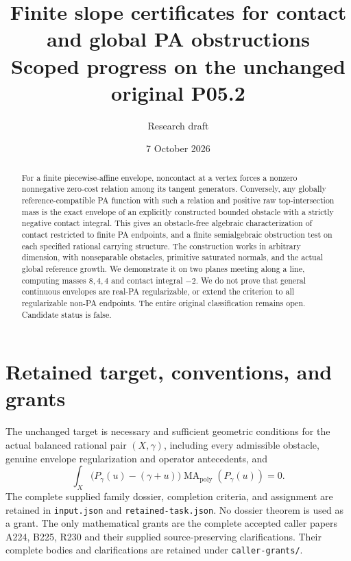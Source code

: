\documentclass[11pt]{article}
\title{Finite slope certificates for contact and global PA obstructions\\
\large Scoped progress on the unchanged original P05.2}
\author{Research draft}
\date{7 October 2026}
\newcommand{\MA}{\operatorname{MA}_{\mathrm{poly}}}
\begin{document}
\maketitle
\begin{abstract}
For a finite piecewise-affine envelope, noncontact at a vertex forces a nonzero
nonnegative zero-cost relation among its tangent generators. Conversely, any
globally reference-compatible PA function with such a relation and positive
raw top-intersection mass is the exact envelope of an explicitly constructed
bounded obstacle with a strictly negative contact integral. This gives an
obstacle-free algebraic characterization of contact restricted to finite PA
endpoints, and a finite semialgebraic obstruction test on each specified
rational carrying structure. The construction works in arbitrary dimension,
with nonseparable obstacles, primitive saturated normals, and the actual
global reference growth. We demonstrate it on two planes meeting along a
line, computing masses \(8,4,4\) and contact integral \(-2\). We do not prove
that general continuous envelopes are real-PA regularizable, or extend the
criterion to all regularizable non-PA endpoints. The entire original
classification remains open. Candidate status is false.
\end{abstract}

\section{Retained target, conventions, and grants}
The unchanged target is necessary and sufficient geometric conditions for
the actual balanced rational pair \((X,\gamma)\), including every admissible
obstacle, genuine envelope regularization and operator antecedents, and
\[
 \int_X\bigl(P_\gamma(u)-(\gamma+u)\bigr)\MA(P_\gamma(u))=0.
\]
The complete supplied family dossier, completion criteria, and assignment
are retained in \texttt{input.json} and \texttt{retained-task.json}. No
dossier theorem is used as a grant. The only mathematical grants are the
complete accepted caller papers A224, B225, R230 and their supplied
source-preserving clarifications. Their complete bodies and clarifications
are retained under \texttt{caller-grants/}.
\end{document}
